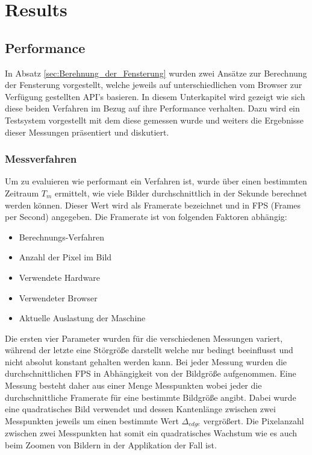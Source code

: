 
\section{Results}
\label{sec:results}

\subsection{Performance}
\label{sec:Performance}

In Absatz \ref{sec:Berehnung_der_Fensterung} wurden zwei Ansätze zur Berechnung der Fensterung vorgestellt,
welche jeweils auf unterschiedlichen vom Browser zur Verfügung gestellten API's basieren.
In diesem Unterkapitel wird gezeigt wie sich diese beiden Verfahren im Bezug auf ihre Performance verhalten.
Dazu wird ein Testsystem vorgestellt mit dem diese gemessen wurde und weiters die Ergebnisse dieser Messungen präsentiert und diskutiert.

\subsubsection{Messverfahren}
Um zu evaluieren wie performant ein Verfahren ist,
wurde über einen bestimmten Zeitraum $T_m$ ermittelt, wie viele Bilder durchschnittlich in der Sekunde berechnet werden können.
Dieser Wert wird als Framerate bezeichnet und in FPS (Frames per Second) angegeben.
Die Framerate ist von folgenden Faktoren abhängig:
\begin{itemize}
	\item Berechnungs-Verfahren
	\item Anzahl der Pixel im Bild
	\item Verwendete Hardware
	\item Verwendeter Browser
	\item Aktuelle Auslastung der Maschine
\end{itemize}
Die ersten vier Parameter wurden für die verschiedenen Messungen variert, während der letzte eine Störgröße darstellt welche nur bedingt beeinflusst und nicht absolut konstant gehalten werden kann.
Bei jeder Messung wurden die durchschnittlichen FPS in Abhängigkeit von der Bildgröße aufgenommen.
Eine Messung besteht daher aus einer Menge Messpunkten wobei jeder die durchschnittliche Framerate für eine bestimmte Bildgröße angibt.
Dabei wurde eine quadratisches Bild verwendet und dessen Kantenlänge zwischen zwei Messpunkten jeweils um einen bestimmte Wert $\Delta_{edge}$ vergrößert.
Die Pixelanzahl zwischen zwei Messpunkten hat somit ein quadratisches Wachstum wie es auch beim Zoomen von Bildern in der Applikation der Fall ist.

